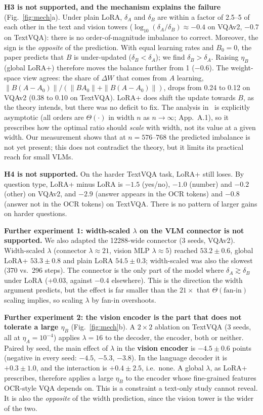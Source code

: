 \documentclass[10pt,a4paper]{article}
\newcommand{\etaA}{\eta_A}
\newcommand{\etaB}{\eta_B}
\begin{document}
\textbf{H3 is not supported, and the mechanism explains the failure} (Fig.~\ref{fig:mech}a). Under plain LoRA,
$\delta_A$ and $\delta_B$ are within a factor of 2.5--5 of each other in the text and vision towers
($\log_{10}(\delta_A/\delta_B)\approx-0.4$ on VQAv2, $-0.7$ on TextVQA): there is no order-of-magnitude imbalance to
correct. Moreover, the sign is the \emph{opposite} of the prediction. With equal learning rates and $B_0=0$, the
paper predicts that $B$ is under-updated ($\delta_B < \delta_A$); we find $\delta_B > \delta_A$. Raising $\etaB$
(global LoRA+) therefore moves the balance further from 1 ($-0.6$). The weight-space view agrees: the share of $\Delta W$ that comes from
$A$ learning, $\|B(A-A_0)\| / (\|BA_0\| + \|B(A-A_0)\|)$, drops from 0.24 to 0.12 on VQAv2 (0.38 to 0.10 on
TextVQA). LoRA+ does shift the update towards $B$, as the theory intends, but there was no deficit to fix. The
analysis in~\cite{loraplus} is explicitly asymptotic (all orders are $\Theta(\cdot)$ in width $n$ as $n \to \infty$;
App.~A.1), so it prescribes how the optimal ratio should \emph{scale} with width, not its value at a given width. Our
measurement shows that at $n = 576$--$768$ the predicted imbalance is not yet present; this does not contradict the
theory, but it limits its practical reach for small VLMs.

\textbf{H4 is not supported.} On the harder TextVQA task, LoRA+ still loses. By question type, LoRA+ minus LoRA is
$-1.5$ (yes/no), $-1.0$ (number) and $-0.2$ (other) on VQAv2, and $-2.9$ (answer appears in the OCR tokens) and
$-0.8$ (answer not in the OCR tokens) on TextVQA. There is no pattern of larger gains on harder questions.

\textbf{Further experiment 1: width-scaled $\lambda$ on the VLM connector is not supported.} We also adapted the 12288-wide
connector (3 seeds, VQAv2). Width-scaled $\lambda$ (connector $\lambda \approx 21$, vision MLP $\lambda \approx 5$)
reached $53.2\pm0.6$, global LoRA+ $53.3\pm0.8$ and plain LoRA $54.5\pm0.3$; width-scaled was also the slowest (370
vs.\ 296 steps). The connector is the only part of the model where $\delta_A \gtrsim \delta_B$ under LoRA (+0.03,
against $-0.4$ elsewhere). This is the direction the width argument predicts, but the effect is far smaller than
the $21\times$ that $\Theta(\text{fan-in})$ scaling implies, so scaling $\lambda$ by fan-in overshoots.

\textbf{Further experiment 2: the vision encoder is the part that does not tolerate a large $\etaB$} (Fig.~\ref{fig:mech}b). A
$2\times2$ ablation on TextVQA (3 seeds, all at $\etaA = 10^{-4}$) applies $\lambda = 16$ to the decoder, the
encoder, both or neither. Paired by seed, the main effect of $\lambda$ in the \textbf{vision encoder} is
$\mathbf{-4.5\pm0.6}$ points (negative in every seed: $-4.5$, $-5.3$, $-3.8$). In the language decoder it is
$+0.3\pm1.0$, and the interaction is $+0.4\pm2.5$, i.e.\ none. A global $\lambda$, as LoRA+ prescribes, therefore
applies a large $\etaB$ to the encoder whose fine-grained features OCR-style VQA depends on. This is a constraint a
text-only study cannot reveal. It is also the \emph{opposite} of the width prediction, since the vision tower is the
wider of the two.
\end{document}
